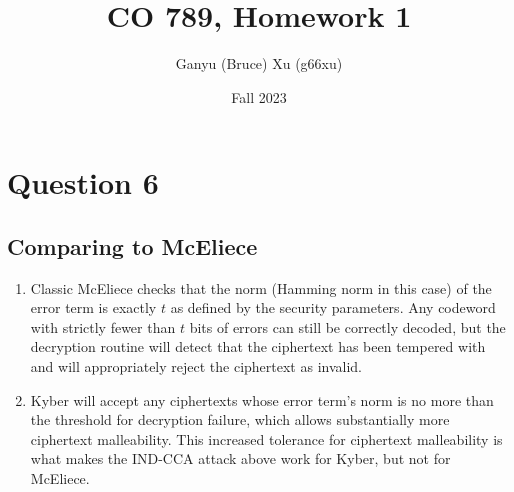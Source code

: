 \documentclass{article}
\title{CO 789, Homework 1}
\author{Ganyu (Bruce) Xu (g66xu)}
\date{Fall 2023}
\begin{document}

\section*{Question 6}


\subsection*{Comparing to McEliece}
\begin{enumerate}
    \item Classic McEliece checks that the norm (Hamming norm in this case) of the error term is exactly $t$ as defined by the security parameters. Any codeword with strictly fewer than $t$ bits of errors can still be correctly decoded, but the decryption routine will detect that the ciphertext has been tempered with and will appropriately reject the ciphertext as invalid.
    \item Kyber will accept any ciphertexts whose error term's norm is no more than the threshold for decryption failure, which allows substantially more ciphertext malleability. This increased tolerance for ciphertext malleability is what makes the IND-CCA attack above work for Kyber, but not for McEliece.
\end{enumerate}
\end{document}
